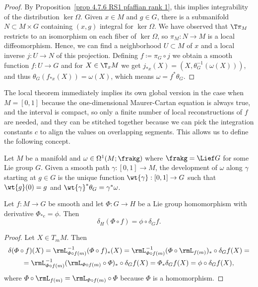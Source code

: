 \begin{proof}
    By Proposition~\ref{prop 4.7.6 RS1 pfaffian rank 1}, this implies integrability of the distribution $\ker\varOmega$. Given $x\in M$ and $g\in G$, there is a submanifold $N\subset M\times G$ containing $(x,g)$ integral for $\ker\varOmega$. We have observed that $\T\pi_M$ restricts to an isomorphism on each fiber of $\ker \varOmega$, so $\pi_M:N\to M$ is a local diffeomorphism. Hence, we can find a neighborhood $U\subset M$ of $x$ and a local inverse $j:U\to N$ of this projection. Defining $f\coloneqq \pi_G\circ j$ we obtain a smooth function $f:U\to G$ and for $X\in \T_xM$ we get $j_{\ast x}(X)=(X,\theta_G^{-1}(\omega(X)))$, and thus $\theta_G(f_{\ast x}(X))=\omega(X)$, which means $\omega=f^\ast\theta_G$.
\end{proof}


The local theorem immediately implies its own global version in the case when $M=[0,1]$ because the one-dimensional Maurer-Cartan equation is always true, and the interval is compact, so only a finite number of local reconstructions of $f$ are needed, and they can be stitched together because we can pick the integration constants $c$ to align the values on overlapping segments. This allows us to define the following concept.

\begin{defn}
    Let $M$ be a manifold and $\omega\in\Omega^1(M;\frakg)$ where $\frakg=\Lief G$ for some Lie group $G$. Given a smooth path $\gamma:[0,1]\to M$, the development of $\omega$ along $\gamma$ starting at $g\in G$ is the unique function $\wt{\gamma}:[0,1]\to G$ such that $\wt{g}(0)=g$ and $\wt{\gamma}^\ast\theta_G=\gamma^\ast\omega$.
\end{defn}

\begin{lem}\label{lem log derivative of homomorphism}
    Let $f:M\to G$ be smooth and let $\varPhi:G\to H$ be a Lie group homomorphism with derivative $\varPhi_{\ast e}=\phi$. Then 
    \[\delta_H (\varPhi\circ f)=\phi\circ\delta_G f.\]
\end{lem}
\begin{proof}
    Let $X\in T_m M$. Then
    \begin{multline}
        \delta(\varPhi\circ f)(X)=\rmL_{\varPhi\circ f(m)}^{-1}(\varPhi\circ f)_\ast(X)=\rmL_{\varPhi\circ f(m)}^{-1}(\varPhi\circ  \rmL_{f(m)})_\ast\circ  \delta_G f(X)=\\
        =\rmL_{\varPhi\circ f(m)}^{-1}(\rmL_{\varPhi\circ f(m)}\circ \varPhi)_\ast\circ  \delta_G f(X)=\varPhi_\ast\delta_G f(X)=\phi\circ \delta_G f(X),
    \end{multline}
    where $\varPhi\circ \rmL_{f(m)}=\rmL_{\varPhi\circ f(m)}\circ \varPhi$ because $\varPhi$ is a homomorphism.
\end{proof}

